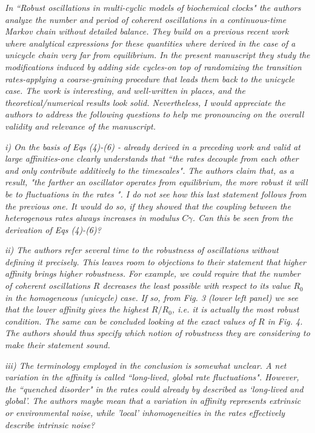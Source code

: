 \documentclass[amsmath, preprintnumbers, 12pt, onecolumn, pre, longbibliograpy]{revtex4-1}
\begin{document}
\textit{In ``Robust oscillations in multi-cyclic models of biochemical clocks" the authors analyze the number and period of coherent oscillations in a continuous-time Markov chain without detailed balance. They build on a previous recent work where analytical expressions for these quantities where derived in the case of a unicycle chain very far from equilibrium. In the present manuscript they study the modifications induced by adding side cycles-on top of randomizing the transition rates-applying a coarse-graining procedure that leads them back to the unicycle case. The work is interesting, and well-written in places, and the theoretical/numerical results look solid. Nevertheless, I would appreciate the authors to address the following questions to help me pronouncing on the overall validity and relevance of the manuscript.}

\textit{i) On the basis of Eqs (4)-(6) - already derived in a preceding work and valid at large affinities-one clearly understands that ``the rates decouple from each other and only contribute additively to the timescales". The authors claim that, as a result, "the farther an oscillator operates from equilibrium, the more robust it will be to fluctuations in the rates ". I do not see how this last statement follows from the previous one. It would do so, if they showed that the coupling between the heterogenous rates always increases in modulus $C \gamma$. Can this be seen from the derivation of Eqs (4)-(6)?}

\textit{ii) The authors refer several time to the robustness of oscillations without defining it precisely. This leaves room to objections to their statement that higher affinity brings higher robustness. For example, we could require that the number of coherent oscillations $R$ decreases the least possible with respect to its value $R_0$ in the homogeneous (unicycle) case. If so, from Fig. 3 (lower left panel) we see that the lower affinity gives the highest $R/R_0$, i.e. it is actually the most robust condition. The same can be concluded looking at the exact values of $R$ in Fig. 4.
The authors should thus specify which notion of robustness they are considering to make their statement sound.}

\textit{iii) The terminology employed in the conclusion is somewhat unclear. A net variation in the affinity is called ``long-lived, global rate fluctuations". However, the ``quenched disorder" in the rates could already by described as `long-lived and global'. The authors maybe mean that a variation in affinity represents extrinsic or environmental noise, while 'local' inhomogeneities in the rates effectively describe intrinsic noise?}
\end{document}
